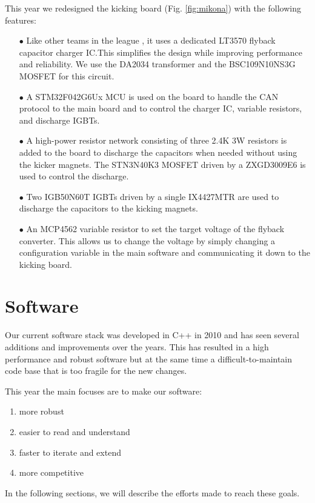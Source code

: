\documentclass[runningheads]{llncs}
\begin{document}
This year we redesigned the kicking board (Fig. \ref{fig:mikona}) with the following features:
\begin{enumerate}
    \item[$\bullet$] Like other teams in the league \cite{ref_tigers_etdp_2020}, it uses a dedicated LT3570 flyback capacitor charger IC.This simplifies the design while improving performance and reliability. We use the DA2034 transformer and the BSC109N10NS3G MOSFET for this circuit.
    \item[$\bullet$] A STM32F042G6Ux MCU is used on the board to handle the CAN protocol to the main board and to control the charger IC, variable resistors, and discharge IGBTs.
    \item[$\bullet$] A high-power resistor network consisting of three 2.4K 3W resistors is added to the board to discharge the capacitors when needed without using the kicker magnets. The STN3N40K3 MOSFET driven by a ZXGD3009E6 is used to control the discharge.
    \item[$\bullet$] Two IGB50N60T IGBTs driven by a single IX4427MTR are used to discharge the capacitors to the kicking magnets.
    \item[$\bullet$] An MCP4562 variable resistor to set the target voltage of the flyback converter. This allows us to change the voltage by simply changing a configuration variable in the main software and communicating it down to the kicking board.
\end{enumerate}

\section{Software}
Our current software stack was developed in C++ in 2010 and has seen several additions and improvements over the years. This has resulted in a high performance and robust software but at the same time a difficult-to-maintain code base that is too fragile for the new changes.

This year the main focuses are to make our software:

\begin{enumerate}
    \item more robust
    \item easier to read and understand
    \item faster to iterate and extend
    \item more competitive
\end{enumerate}
In the following sections, we will describe the efforts made to reach these goals.
\end{document}
